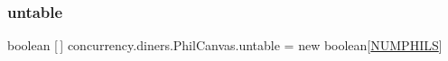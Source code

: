 \subsubsection{\texorpdfstring{untable}{untable}}
{\footnotesize\ttfamily boolean \mbox{[}$\,$\mbox{]} concurrency.\+diners.\+Phil\+Canvas.\+untable = new boolean\mbox{[}\mbox{\hyperlink{classconcurrency_1_1diners_1_1_phil_canvas_a3eeb58e8b150bc1715a708ef38171fd5}{N\+U\+M\+P\+H\+I\+LS}}\mbox{]}\hspace{0.3cm}{\ttfamily [package]}}

